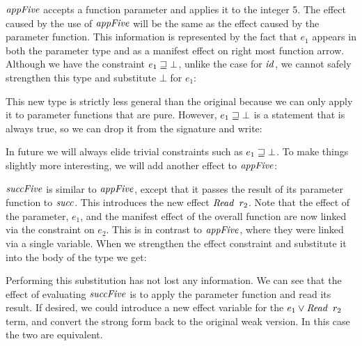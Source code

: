 $\operatorname{\mathit{appFive}}$ accepts a function parameter and applies it to the integer 5. The effect caused by the use of $\operatorname{\mathit{appFive}}$ will be the same as the effect caused by the parameter function. This information is represented by the fact that $e_1$ appears in both the parameter type and as a manifest effect on right most function arrow. Although we have the constraint $e_1 \sqsupseteq \bot$, unlike the case for $\operatorname{\mathit{id}}$, we cannot safely strengthen this type and substitute $\bot$ for $e_1$:

\medskip

This new type is strictly less general than the original because we can only apply it to parameter functions that are pure. However, $e_1 \sqsupseteq \bot$ is a statement that is always true, so we can drop it from the signature and write:

\medskip

In future we will always elide trivial constraints such as $e_1 \sqsupseteq \bot$. To make things slightly more interesting, we will add another effect to $\operatorname{\mathit{appFive}}$:


$\operatorname{\mathit{succFive}}$ is similar to $\operatorname{\mathit{appFive}}$, except that it passes the result of its parameter function to $\operatorname{\mathit{succ}}$. This introduces the new effect $\iRead \ r_2$. Note that the effect of the parameter, $e_1$, and the manifest effect of the overall function are now linked via the constraint on $e_2$. This is in contrast to $\operatorname{\mathit{appFive}}$, where they were linked via a single variable. When we strengthen the effect constraint and substitute it into the body of the type we get:

\medskip

Performing this substitution has not lost any information. We can see that the effect of evaluating $\operatorname{\mathit{succFive}}$ is to apply the parameter function and read its result. If desired, we could introduce a new effect variable for the $e_1 \lor \iRead \ r_2$ term, and convert the strong form back to the original weak version. In this case the two are equivalent.

